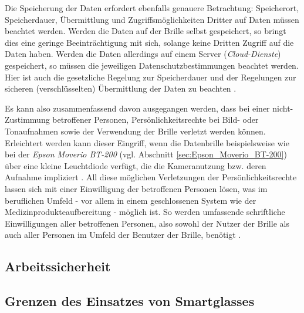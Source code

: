 Die Speicherung der Daten erfordert ebenfalls genauere Betrachtung: Speicherort, Speicherdauer, Übermittlung und Zugriffsmöglichkeiten Dritter auf Daten müssen beachtet werden. Werden die Daten auf der Brille selbst gespeichert, so bringt dies eine geringe Beeinträchtigung mit sich, solange keine Dritten Zugriff auf die Daten haben. Werden die Daten allerdings auf einem Server (\emph{Cloud-Dienste}) gespeichert, so müssen die jeweiligen Datenschutzbestimmungen beachtet werden. Hier ist auch die gesetzliche Regelung zur Speicherdauer und der Regelungen zur sicheren (verschlüsselten) Übermittlung der Daten zu beachten \cite[S.~165f]{Schwenke2016}.

Es kann also zusammenfassend davon ausgegangen werden, dass bei einer nicht-Zustimmung betroffener Personen, Persönlichkeitsrechte bei Bild- oder Tonaufnahmen sowie der Verwendung der Brille verletzt werden können. Erleichtert werden kann dieser Eingriff, wenn die Datenbrille beispielsweise wie bei der \emph{Epson Moverio BT-200} (vgl. Abschnitt \ref{sec:Epson_Moverio_BT-200}) über eine kleine Leuchtdiode verfügt, die die Kameranutzung bzw. deren Aufnahme impliziert \cite[S.~161]{Schwenke2016}. All diese möglichen Verletzungen der Persönlichkeitsrechte lassen sich mit einer Einwilligung der betroffenen Personen lösen, was im beruflichen Umfeld - vor allem in einem geschlossenen System wie der Medizinprodukteaufbereitung - möglich ist. So werden umfassende schriftliche Einwilligungen aller betroffenen Personen, also sowohl der Nutzer der Brille als auch aller Personen im Umfeld der Benutzer der Brille, benötigt \cite[S.~139f]{Schwenke2016}.
%
%
\subsection{Arbeitssicherheit}
%
%
\subsection{Grenzen des Einsatzes von Smartglasses}
